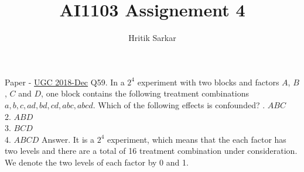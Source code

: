 \documentclass{article}
\title{AI1103 Assignement 4}
\author{Hritik Sarkar}
\theoremstyle{remark}
\begin{document}
\maketitle
Paper - \href{https://github.com/gadepall/papers/blob/master/ugc/math/dec-math-set-a-2018.pdf}{UGC 2018-Dec}
\newline
\newline
Q59. In a $2^{4}$ experiment with two blocks and factors $A$, $B$, $C$ and $D$, one block contains the following treatment combinations $a,b,c,ad,bd,cd,abc,abcd$. Which of the following effects is confounded?
. $ABC$\\
2. $ABD$\\
3. $BCD$\\
4. $ABCD$
\newline
\newline
Answer. It is a $2^{4}$ experiment, which means that the each factor has two levels and there are a total of 16 treatment combination under consideration. We denote the two levels of each factor by 0 and 1.
\end{document}
